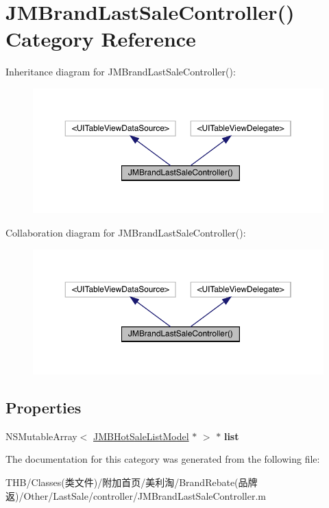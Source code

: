 \hypertarget{category_j_m_brand_last_sale_controller_07_08}{}\section{J\+M\+Brand\+Last\+Sale\+Controller() Category Reference}
\label{category_j_m_brand_last_sale_controller_07_08}


Inheritance diagram for J\+M\+Brand\+Last\+Sale\+Controller()\+:\nopagebreak
\begin{figure}[H]
\begin{center}
\leavevmode
\includegraphics[width=350pt]{category_j_m_brand_last_sale_controller_07_08__inherit__graph}
\end{center}
\end{figure}


Collaboration diagram for J\+M\+Brand\+Last\+Sale\+Controller()\+:\nopagebreak
\begin{figure}[H]
\begin{center}
\leavevmode
\includegraphics[width=350pt]{category_j_m_brand_last_sale_controller_07_08__coll__graph}
\end{center}
\end{figure}
\subsection*{Properties}
\begin{DoxyCompactItemize}
\item 
\mbox{\label{category_j_m_brand_last_sale_controller_07_08_a5d5acdc852f51de6dcfe51cb8683918c}} 
N\+S\+Mutable\+Array$<$ \mbox{\hyperlink{interface_j_m_b_hot_sale_list_model}{J\+M\+B\+Hot\+Sale\+List\+Model}} $\ast$ $>$ $\ast$ {\bfseries list}
\end{DoxyCompactItemize}


The documentation for this category was generated from the following file\+:\begin{DoxyCompactItemize}
\item 
T\+H\+B/\+Classes(类文件)/附加首页/美利淘/\+Brand\+Rebate(品牌返)/\+Other/\+Last\+Sale/controller/J\+M\+Brand\+Last\+Sale\+Controller.\+m\end{DoxyCompactItemize}

